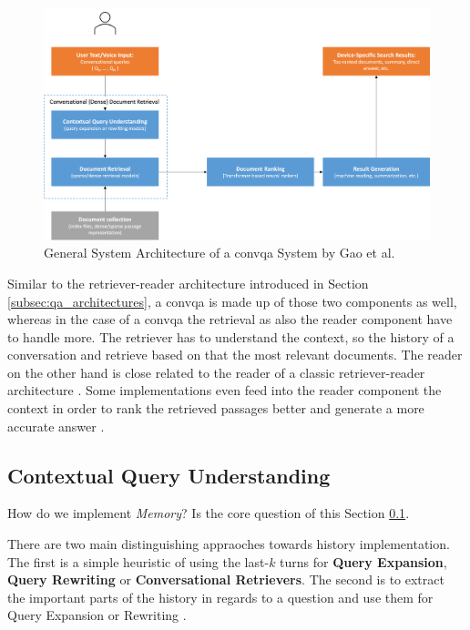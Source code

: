 \begin{figure}
    \centering
    \includegraphics[width=\textwidth]{Grafiken/System_Architecture_ConQA.png}
    \caption{General System Architecture of a \gls{convqa} System by Gao et al. \cite{gao_neural_2022}}
    \label{fig:convqa_system_architecture}
\end{figure}

Similar to the retriever-reader architecture introduced in Section \ref{subsec:qa_architectures}, a \gls{convqa} is made up of those two components as well, whereas in the case of a \gls{convqa} the retrieval as also the reader component have to handle more. The retriever has to understand the context, so the history of a conversation and retrieve based on that the most relevant documents. The reader on the other hand is close related to the reader of a classic retriever-reader architecture \cite{zamani_conversational_2023,gao_neural_2022}. Some implementations even feed into the reader component the context in order to rank the retrieved passages better and generate a more accurate answer \cite{owoicho_trec_2022}.

\subsection{Contextual Query Understanding}
\label{subsec:cqa_contextual_query_understanding}

How do we implement \textit{Memory}? Is the core question of this Section \ref{subsec:cqa_contextual_query_understanding}. 

There are two main distinguishing appraoches towards history implementation. The first is a simple heuristic of using the last-$k$ turns for \textbf{Query Expansion}, \textbf{Query Rewriting} or \textbf{Conversational Retrievers}. The second is to extract the important parts of the history in regards to a question and use them for Query Expansion or Rewriting \cite{gao_neural_2022}.

